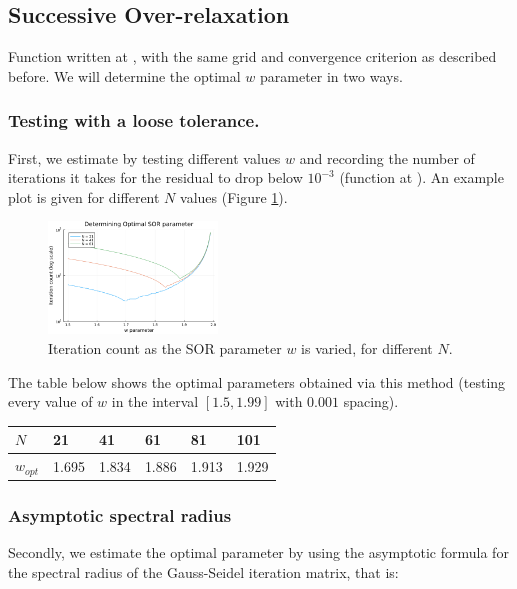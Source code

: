 \documentclass{article}
\numberwithin{equation}{section}
\theoremstyle{definition}
\begin{document}
\subsection{Successive Over-relaxation}
Function written at , with the same grid and convergence criterion as described before. We will determine the optimal $w$ parameter in two ways.

\subsubsection{Testing with a loose tolerance.}
First, we estimate by testing different values $w$ and recording the number of iterations it takes for the residual to drop below $10^{-3}$ (function at ). An example plot is given for different $N$ values (Figure \ref{fig:figsor1}).

\begin{figure}[H]
    \centering
    \includegraphics[width=0.4\textwidth]{figsor1.png}
    \caption{Iteration count as the SOR parameter $w$ is varied, for different $N$.}
    \label{fig:figsor1}
\end{figure}

The table below shows the optimal parameters obtained via this method (testing every value of $w$ in the interval $[1.5, 1.99]$ with $0.001$ spacing).

\begin{table}[H]
    \centering
    \begin{tabular}{|l|l|l|l|l|l|}
    \hline
    $N$       & 21    & 41    & 61    & 81    & 101   \\ \hline
    $w_{opt}$ & 1.695 & 1.834 & 1.886 & 1.913 & 1.929 \\ \hline
    \end{tabular}
\end{table}


\subsubsection{Asymptotic spectral radius}
Secondly, we estimate the optimal parameter by using the asymptotic formula for the spectral radius of the Gauss-Seidel iteration matrix, that is:
\end{document}

